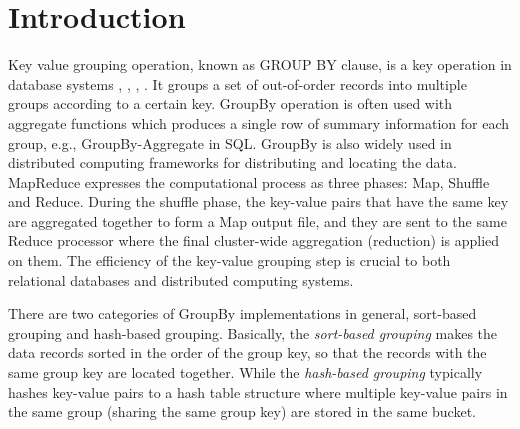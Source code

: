 \section{Introduction}
\label{sec:intro}

Key value grouping operation, known as GROUP BY clause, is a key operation in database systems \cite{gray1997data}, \cite{stephens2005oracle}, \cite{mysql2009mysql}, \cite{momjian2001postgresql}. It groups a set of out-of-order records into multiple groups according to a certain key. GroupBy operation is often used with aggregate functions which produces a single row of summary information for each group, e.g., GroupBy-Aggregate in SQL. GroupBy is also widely used in distributed computing frameworks for distributing and locating the data. MapReduce \cite{dean2008mapreduce} expresses the computational process as three phases: Map, Shuffle and Reduce. During the shuffle phase, the key-value pairs that have the same key are aggregated together to form a Map output file, and they are sent to the same Reduce processor where the final cluster-wide aggregation (reduction) is applied on them. The efficiency of the key-value grouping step is crucial to both relational databases and distributed computing systems.



There are two categories of GroupBy implementations in general, sort-based grouping and hash-based grouping. Basically, the \emph{sort-based grouping} makes the data records sorted in the order of the group key, so that the records with the same group key are located together. While the \emph{hash-based grouping} typically hashes key-value pairs to a hash table structure where multiple key-value pairs in the same group (sharing the same group key) are stored in the same bucket.

